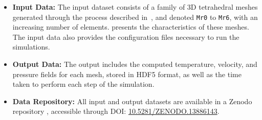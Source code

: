 \begin{itemize}
    \item \textbf{Input Data:} The input dataset consists of a family of 3D tetrahedral meshes generated through the process described in~\cite{chabannes_3d_2024}, and denoted \texttt{Mr0} to \texttt{Mr6}, with an increasing number of elements.
     presents the characteristics of these meshes.
    The input data also provides the configuration files necessary to run the simulations.
    \item \textbf{Output Data:} The output includes the computed temperature, velocity, and pressure fields for each mesh, stored in HDF5 format, as well as the time taken to perform each step of the simulation.
    \item \textbf{Data Repository:} All input and output datasets are available in a Zenodo repository \cite{saigre_mesh_2024}, accessible through DOI: \href{https://doi.org/10.5281/ZENODO.13886143}{10.5281/ZENODO.13886143}.
\end{itemize}


